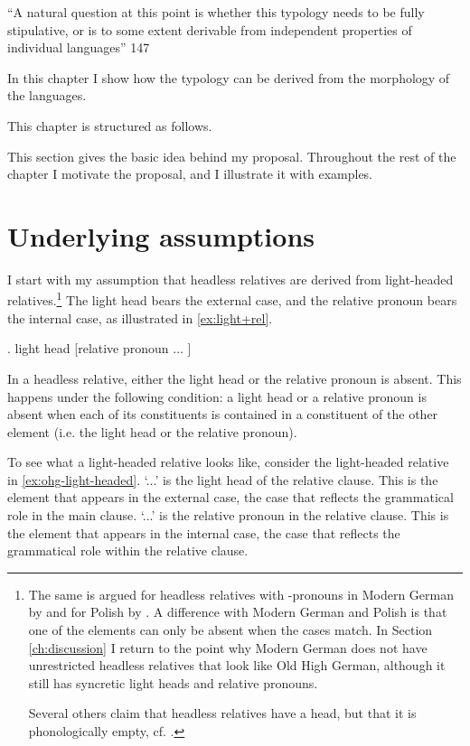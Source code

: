``A natural question at this point is whether this typology needs to be fully stipulative, or is to some extent derivable from independent properties of individual languages'' \citet{grosu1994}{147}

In this chapter I show how the typology can be derived from the morphology of the languages.

This chapter is structured as follows.


This section gives the basic idea behind my proposal. Throughout the rest of the chapter I motivate the proposal, and I illustrate it with examples.

\section{Underlying assumptions}

I start with my assumption that headless relatives are derived from light-headed relatives.\footnote{
The same is argued for headless relatives with -pronouns in Modern German by \citealt{fuss2014,hanink2018} and for Polish by \citealt{citko2004}.
A difference with Modern German and Polish is that one of the elements can only be absent when the cases match. In Section \ref{ch:discussion} I return to the point why Modern German does not have unrestricted headless relatives that look like Old High German, although it still has syncretic light heads and relative pronouns.

Several others claim that headless relatives have a head, but that it is phonologically empty, cf. \citealt{bresnan1978,groos1981,himmelreich2017}.
}
The light head bears the external case, and the relative pronoun bears the internal case, as illustrated in \ref{ex:light+rel}.

\ex. light head [relative pronoun ... ]\label{ex:light+rel}

In a headless relative, either the light head or the relative pronoun is absent.
This happens under the following condition: a light head or a relative pronoun is absent when each of its constituents is contained in a constituent of the other element (i.e. the light head or the relative pronoun).

To see what a light-headed relative looks like, consider the light-headed relative in \ref{ex:ohg-light-headed}.
 `...' is the light head of the relative clause. This is the element that appears in the external case, the case that reflects the grammatical role in the main clause.
 `...' is the relative pronoun in the relative clause. This is the element that appears in the internal case, the case that reflects the grammatical role within the relative clause.

